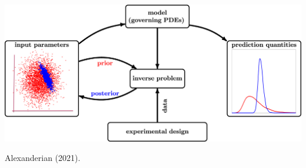\documentclass{beamer}
\begin{document}
\begin{frame}

  
  
\end{frame}



\begin{frame}
  \begin{center}
    \includegraphics[width=\textwidth]{figs/bayesian_inverse_problems.jpg}
  \end{center}
  \footnotesize{Alexanderian (2021).}
\end{frame}
\end{document}
